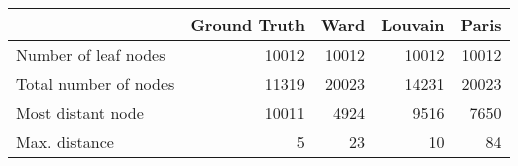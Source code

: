 \begin{tabular}{lrrrr}
\toprule
{} &  Ground Truth &   Ward &  Louvain &  Paris \\
\midrule
Number of leaf nodes  &         10012 &  10012 &    10012 &  10012 \\
Total number of nodes &         11319 &  20023 &    14231 &  20023 \\
Most distant node     &         10011 &   4924 &     9516 &   7650 \\
Max. distance         &             5 &     23 &       10 &     84 \\
\bottomrule
\end{tabular}
